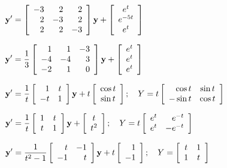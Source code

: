 \begin{exerciselist}
  \item\label{exer:10.7.9} $\displaystyle{{\bf y}'=\left[\begin{array}{rrr} -3&2&2\\2&-3&2\\2&2&-3\end{array}\right]{\bf y}+\left[\begin{array}{cc}e^{t}\\e^{-5t}\\e^{t}\end{array}\right]}$

  \item\label{exer:10.7.10}$\displaystyle{{\bf y}'=\frac{1}{3}\left[\begin{array}{rrr} 1&1&-3\\-4&-4&3\\-2&1&0\end{array}\right]{\bf y}+\left[\begin{array}{cc}e^{t}\\e^{t}\\e^{t}\end{array}\right]}$


  \item\label{exer:10.7.11} $\displaystyle{{\bf y}'=\frac{1}{t}\left[\begin{array}{rc}1&t\\-t&1\end{array}\right]{\bf y} +t\left[\begin{array}{cc}\cos t\\\sin t\end{array}\right];\quad Y=t\left[\begin{array}{rc}\cos t&\sin t\\-\sin t&\cos t\end{array}\right]}$

  \item\label{exer:10.7.12} $\displaystyle{{\bf y}'=\frac{1}{t}\left[\begin{array}{cc}1&t\\t&1\end{array}\right]{\bf y} +\left[\begin{array}{c}t\\t^{2}\end{array}\right];\quad Y=t\left[\begin{array}{cr}e^{t}&e^{-t}\\e^{t}&-e^{-t}\end{array}\right]}$

  \item\label{exer:10.7.13} $\displaystyle{{\bf y}'=\frac{1}{t^{2}-1}\left[\begin{array}{rr}t&-1\\-1&t\end{array}\right]{\bf y}+ t\left[\begin{array}{r}1\\-1\end{array}\right];\quad Y=\left[\begin{array}{cc}t&1\\1&t\end{array}\right]}$


\end{exerciselist}
